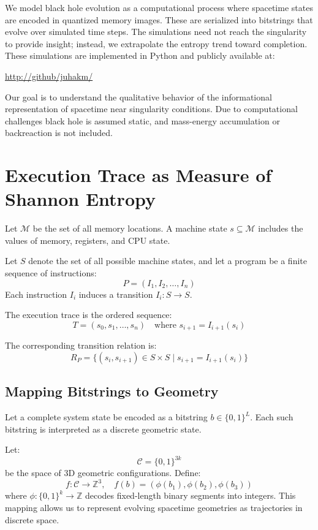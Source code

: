 \documentclass[11pt]{article}
\begin{document}
We model black hole evolution as a computational process where spacetime states are encoded in quantized memory images. These are serialized into bitstrings that evolve over simulated time steps. The simulations need not reach the singularity to provide insight; instead, we extrapolate the entropy trend toward completion. These simulations are implemented in Python and publicly available at:

\url{http://github/juhakm/}

Our goal is to understand the qualitative behavior of the informational representation of spacetime near singularity conditions.
Due to computational challenges black hole is assumed static, and mass-energy accumulation or backreaction is not included.



\section{Execution Trace as Measure of Shannon Entropy}

Let $\mathcal{M}$ be the set of all memory locations. A machine state $s \subseteq \mathcal{M}$ includes the values of memory, registers, and CPU state.

Let $S$ denote the set of all possible machine states, and let a program be a finite sequence of instructions:
\[
  P = (I_1, I_2, \dots, I_n)
\]
Each instruction $I_i$ induces a transition $I_i : S \to S$.

The execution trace is the ordered sequence:
\[
  T = (s_0, s_1, \dots, s_n) \quad \text{where } s_{i+1} = I_{i+1}(s_i)
\]

The corresponding transition relation is:
\[
  R_P = \{ (s_i, s_{i+1}) \in S \times S \mid s_{i+1} = I_{i+1}(s_i) \}
\]


\subsection{Mapping Bitstrings to Geometry}

Let a complete system state be encoded as a bitstring $b \in \{0,1\}^L$. Each such bitstring is interpreted as a discrete geometric state.

Let:
\[
  \mathcal{C} = \{0,1\}^{3k}
\]
be the space of 3D geometric configurations. Define:
\[
  f : \mathcal{C} \to \mathbb{Z}^3, \quad f(b) = (\phi(b_1), \phi(b_2), \phi(b_3))
\]
where $\phi : \{0,1\}^k \to \mathbb{Z}$ decodes fixed-length binary segments into integers. This mapping allows us to represent evolving spacetime geometries as trajectories in discrete space.
\end{document}
